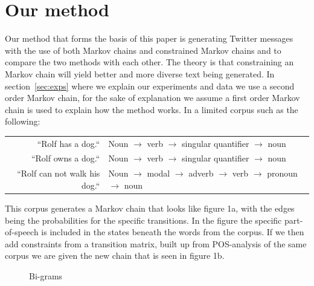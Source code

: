 \documentclass[a4paper,12pt]{article}
\begin{document}
\section{Our method}
\label{sec:method}
Our method that forms the basis of this paper is generating Twitter messages with the use of both Markov chains and constrained Markov chains and to compare the two methods with each other.
The theory is that constraining an Markov chain will yield better and more diverse text being generated. 
In section~\ref{sec:exps} where we explain our experiments and data we use a second order Markov chain, 
for the sake of explanation we assume a first order Markov chain is used to explain how the method works. 
In a limited corpus such as the following: \\

\begin{tabular}{r | l}
``Rolf has a dog.`` & Noun $\to$ verb $\to$ singular quantifier $\to$ noun \\
``Rolf owns a dog.`` & Noun $\to$ verb $\to$ singular quantifier $\to$ noun \\
``Rolf can not walk his dog.`` & Noun $\to$ modal $\to$ adverb $\to$ verb $\to$ pronoun $\to$ noun \\
\end{tabular}

This corpus generates a Markov chain that looks like figure 1a, with the edges being the probabilities for the specific transitions. 
In the figure the specific part-of-speech is included in the states beneath the words from the corpus. 
If we then add constraints from a transition matrix, built up from POS-analysis of the same corpus we are given the new chain that is seen in figure 1b.

\begin{figure}[h!]
  \hfill
  \hfill
  \hfill
  \caption{Bi-grams}
 \end{figure}
\end{document}
